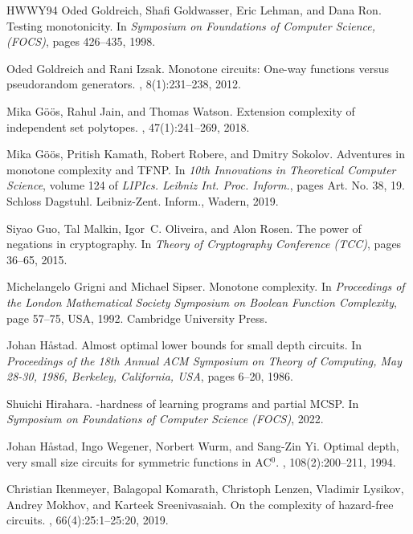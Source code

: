 \documentclass[10pt,a4paper]{article}
\begin{document}
\begin{thebibliography}{HWWY94}
Oded Goldreich, Shafi Goldwasser, Eric Lehman, and Dana Ron.
\newblock Testing monotonicity.
\newblock In {\em Symposium on Foundations of Computer Science, \emph{(FOCS)}},
  pages 426--435, 1998.

Oded Goldreich and Rani Izsak.
\newblock Monotone circuits: One-way functions versus pseudorandom generators.
, 8(1):231--238, 2012.

Mika G{\"{o}}{\"{o}}s, Rahul Jain, and Thomas Watson.
\newblock Extension complexity of independent set polytopes.
, 47(1):241--269, 2018.

Mika G\"{o}\"{o}s, Pritish Kamath, Robert Robere, and Dmitry Sokolov.
\newblock Adventures in monotone complexity and {TFNP}.
\newblock In {\em 10th {I}nnovations in {T}heoretical {C}omputer {S}cience},
  volume 124 of {\em LIPIcs. Leibniz Int. Proc. Inform.}, pages Art. No. 38,
  19. Schloss Dagstuhl. Leibniz-Zent. Inform., Wadern, 2019.

Siyao Guo, Tal Malkin, Igor~C. Oliveira, and Alon Rosen.
\newblock The power of negations in cryptography.
\newblock In {\em Theory of Cryptography Conference \emph{(TCC)}}, pages
  36--65, 2015.

Michelangelo Grigni and Michael Sipser.
\newblock Monotone complexity.
\newblock In {\em Proceedings of the London Mathematical Society Symposium on
  Boolean Function Complexity}, page 57–75, USA, 1992. Cambridge University
  Press.

Johan H{\aa}stad.
\newblock Almost optimal lower bounds for small depth circuits.
\newblock In {\em Proceedings of the 18th Annual {ACM} Symposium on Theory of
  Computing, May 28-30, 1986, Berkeley, California, {USA}}, pages 6--20, 1986.

Shuichi Hirahara.
-hardness of learning programs and partial {MCSP}.
\newblock In {\em Symposium on Foundations of Computer Science \emph{(FOCS)}},
  2022.

Johan H{\aa}stad, Ingo Wegener, Norbert Wurm, and Sang{-}Zin Yi.
\newblock Optimal depth, very small size circuits for symmetric functions in
  {AC}$^0$.
, 108(2):200--211, 1994.

Christian Ikenmeyer, Balagopal Komarath, Christoph Lenzen, Vladimir Lysikov,
  Andrey Mokhov, and Karteek Sreenivasaiah.
\newblock On the complexity of hazard-free circuits.
, 66(4):25:1--25:20, 2019.


\end{thebibliography}
\end{document}
